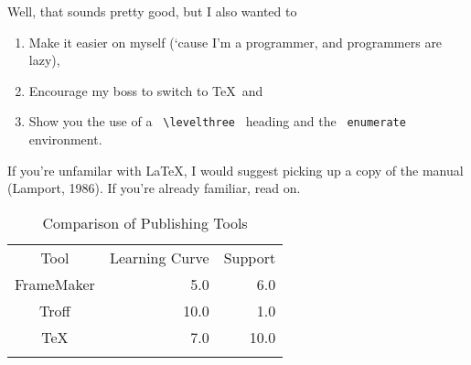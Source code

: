 Well, that sounds pretty good, but I also wanted to
\begin{enumerate}
\item Make it easier on myself (`cause I'm a programmer, and programmers
are lazy),
\item Encourage my boss to switch to \TeX\, and
\item Show you the use of a  \verb# \levelthree # heading and the 
\verb# enumerate # environment.
\end{enumerate}


If you're unfamilar with \LaTeX, I would suggest picking up a copy
of the manual (Lamport, 1986).  \cite[note]{ll:86} If you're already familiar,
read on.

\renewcommand{\footnoterule}{} %
\begin{table}[hbp]
\footnotesize
\caption{Comparison of Publishing Tools}
\begin{center}
\renewcommand{\footnoterule}{} %
\begin{center}
\renewcommand{\thefootnote}{\fnsym{footnote}}

\begin{tabular}{crr} \thickhline  
Tool & \multicolumn{1}{c}{Learning Curve %
}& \multicolumn{1}{c}{Support             %
}\\ \thinhline 
FrameMaker & 5.0 & 6.0 \\  
Troff & 10.0 & 1.0 \\
\TeX                                     %
& 7.0 & 10.0  \\ \thickhline
\end{tabular}
\linethickness{0pt}
\end{center}
\end{center}
\end{table}

